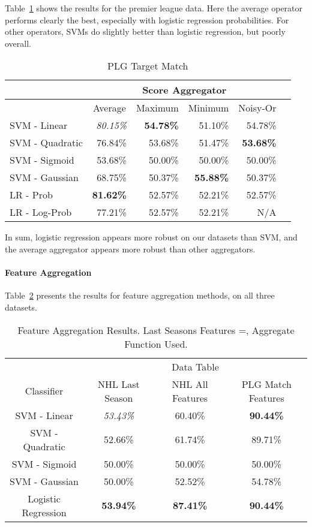 \documentclass[oribibl]{llncs}%
\begin{document}
Table~\ref{table:score-plg} shows the results for the premier league data. Here the average operator performs clearly the best, especially with logistic regression probabilities. For other operators, SVMs do slightly better than logistic regression, but poorly overall. 

\begin{table}[t]
\caption{PLG Target Match}
\centering
\begin{tabular}{|l|r|r|r|r|r|}
\hline
 & \multicolumn{4}{c|}{Score Aggregator}\\ \hline
 & \multicolumn{ 1}{c|}{Average} & \multicolumn{ 1}{c|}{Maximum} & \multicolumn{1}{c|}{Minimum} &
\multicolumn{ 1}{c|}{Noisy-Or}  \\\hline \cline{ 1- 1}
SVM - Linear & \textit{80.15\%} & \textbf{54.78\%} & 51.10\% & 54.78\% \\ \hline
SVM - Quadratic & 76.84\% & 53.68\% & 51.47\% & \textbf{53.68\%} \\ \hline
SVM - Sigmoid & 53.68\% & 50.00\% & 50.00\% & 50.00\% \\ \hline
SVM - Gaussian & 68.75\% & 50.37\% & \textbf{55.88\%} & 50.37\% \\ \hline
LR - Prob & \textbf{81.62\%} & 52.57\% & 52.21\% & 52.57\% \\ \hline
LR - Log-Prob & 77.21\% & 52.57\% & 52.21\% & N/A \\ \hline
\end{tabular}
\label{table:score-plg}
\end{table}%


In sum, logistic regression appears more robust on our datasets than SVM, and the average aggregator appears more robust than other aggregators. 

\paragraph{Feature Aggregation} 

Table~\ref{table:feature-agg} presents the results for feature aggregation methods, on all three datasets. 

\begin{table}[htdp]
\caption{Feature Aggregation Results. Last Seasons Features =, Aggregate Function Used.}
\begin{center}
\begin{tabular}{|c|c|c|c|}
& \multicolumn{3}{c|}{Data Table} \\
Classifier & NHL Last Season  & NHL All Features  & PLG Match Features \\
SVM - Linear & \textit{53.43\%} & 60.40\% & \textbf{90.44\%} \\
SVM - Quadratic & 52.66\% & 61.74\% & 89.71\% \\
SVM - Sigmoid & 50.00\% & 50.00\% & 50.00\% \\
SVM - Gaussian & 50.00\% & 52.52\% & 54.78\% \\
Logistic Regression & \textbf{53.94\%} & \textbf{87.41\%} & \textbf{90.44\%} \\
\end{tabular}
\end{center}
\label{table:feature-agg}
\end{table}%
\end{document}
